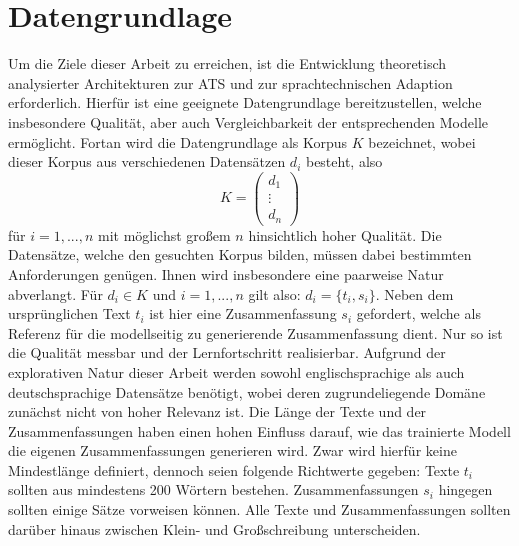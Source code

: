\chapter{Datengrundlage}
\thispagestyle{fancy}
\label{chap:Datengrundlage}

\noindent
Um die Ziele dieser Arbeit zu erreichen, ist die Entwicklung theoretisch analysierter Architekturen zur \ac{ATS} und zur sprachtechnischen Adaption erforderlich. Hierfür ist eine geeignete Datengrundlage bereitzustellen, welche insbesondere Qualität, aber auch Vergleichbarkeit der entsprechenden Modelle ermöglicht. Fortan wird die Datengrundlage als Korpus $K$ bezeichnet, wobei dieser Korpus aus verschiedenen Datensätzen $d_i$ besteht, also $$K=\begin{pmatrix} d_1 \\ \vdots \\ d_n \end{pmatrix}$$ für $i=1,...,n$ mit möglichst großem $n$ hinsichtlich hoher Qualität. Die Datensätze, welche den gesuchten Korpus bilden, müssen dabei bestimmten Anforderungen genügen. Ihnen wird insbesondere eine paarweise Natur abverlangt. Für $d_i \in K$ und $i=1,...,n$ gilt also: $d_i=\{t_i,s_i\}$. Neben dem ursprünglichen Text $t_i$ ist hier eine Zusammenfassung $s_i$ gefordert, welche als Referenz für die modellseitig zu generierende Zusammenfassung dient. Nur so ist die Qualität messbar und der Lernfortschritt realisierbar. Aufgrund der explorativen Natur dieser Arbeit werden sowohl englischsprachige als auch deutschsprachige Datensätze benötigt, wobei deren zugrundeliegende Domäne zunächst nicht von hoher Relevanz ist. Die Länge der Texte und der Zusammenfassungen haben einen hohen Einfluss darauf, wie das trainierte Modell die eigenen Zusammenfassungen generieren wird. Zwar wird hierfür keine Mindestlänge definiert, dennoch seien folgende Richtwerte gegeben: Texte $t_i$ sollten aus mindestens 200 Wörtern bestehen. Zusammenfassungen $s_i$ hingegen sollten einige Sätze vorweisen können. Alle Texte und Zusammenfassungen sollten darüber hinaus zwischen Klein- und Großschreibung unterscheiden.\\

